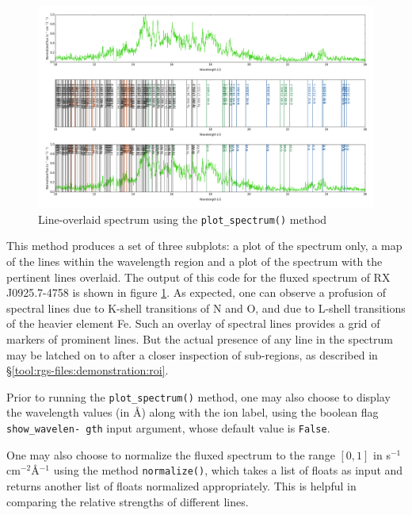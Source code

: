                 \begin{figure}[h!]
    				\centering
    				\includegraphics[width=\textwidth]{images/mrvel_line-overlay}
    				\caption{Line-overlaid spectrum using the \texttt{plot\_spectrum()} method}
    				\label{fig:line-overlay}
			    \end{figure}
                
                This method produces a set of three subplots: a plot of the spectrum only, a map of the lines within the wavelength region and a plot of the spectrum with the pertinent lines overlaid. The output of this code for the fluxed spectrum of RX J0925.7-4758 is shown in figure \ref{fig:line-overlay}. As expected, one can observe a profusion of spectral lines due to K-shell transitions of N and O, and due to L-shell transitions of the heavier element Fe. Such an overlay of spectral lines provides a grid of markers of prominent lines. But the actual presence of any line in the spectrum may be latched on to after a closer inspection of sub-regions, as described in \S\ref{tool:rgs-files:demonstration:roi}.
                
                Prior to running the \texttt{plot\_spectrum()} method, one may also choose to display the wavelength values (in \AA) along with the ion label, using the boolean flag \texttt{show\_wavelen- gth} input argument, whose default value is \texttt{False}.
                
                One may also choose to normalize the fluxed spectrum to the range $[0, 1]$ in s$^{-1}$cm$^{-2}$\AA$^{-1}$ using the method \texttt{normalize()}, which takes a list of floats as input and returns another list of floats normalized appropriately. This is helpful in comparing the relative strengths of different lines.
            
